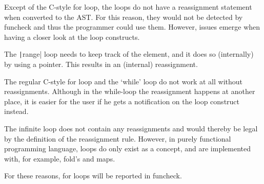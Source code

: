 Except of the C-style for loop, the loops do not have a reassignment statement when
converted to the AST. For this reason, they would not be detected by funcheck and thus
the programmer could use them.
However, issues emerge when having a closer look at the loop constructs.

The \texttt|range| loop needs to keep track of the element, and it does so (internally)
by using a pointer. This results in an (internal) reassignment.

The regular C-style for loop and the `while' loop do not work at all without reassignments.
Although in the while-loop the reassignment happens at another place, it is easier for the
user if he gets a notification on the loop construct instead.

The infinite loop does not contain any reassignments and would thereby be legal by the
definition of the reassignment rule. However, in purely functional programming language,
loops do only exist as a concept, and are implemented with, for example, fold's and maps.

For these reasons, for loops will be reported in funcheck.
